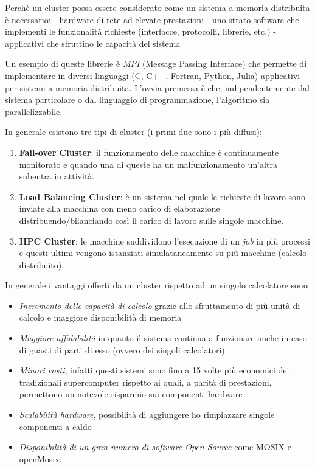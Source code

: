 \documentclass[italian,]{article}
\providecommand{\tightlist}{%
  \setlength{\itemsep}{0pt}\setlength{\parskip}{0pt}}
\begin{document}
Perchè un cluster possa essere considerato come un sistema a memoria
distribuita è necessario: - hardware di rete ad elevate prestazioni -
uno strato software che implementi le funzionalità richieste
(interfacce, protocolli, librerie, etc.) - applicativi che sfruttino le
capacità del sistema

Un esempio di queste librerie è \emph{MPI} (Message Passing Interface)
che permette di implementare in diversi linguaggi (C, C++, Fortran,
Python, Julia) applicativi per sistemi a memoria distribuita. L'ovvia
premessa è che, indipendentemente dal sistema particolare o dal
linguaggio di programmazione, l'algoritmo sia parallelizzabile.

In generale esistono tre tipi di cluster (i primi due sono i più
diffusi):

\begin{enumerate}
\def\labelenumi{\arabic{enumi}.}
\tightlist
\item
  \textbf{Fail-over Cluster}: il funzionamento delle macchine è
  continuamente monitorato e quando una di queste ha un malfunzionamento
  un'altra subentra in attività.
\item
  \textbf{Load Balancing Cluster}: è un sistema nel quale le richieste
  di lavoro sono inviate alla macchina con meno carico di elaborazione
  distribuendo/bilanciando così il carico di lavoro sulle singole
  macchine.
\item
  \textbf{HPC Cluster}: le macchine suddividono l'esecuzione di un
  \emph{job} in più processi e questi ultimi vengono istanziati
  simulataneamente su più macchine (calcolo distribuito).
\end{enumerate}

In generale i vantaggi offerti da un cluster rispetto ad un singolo
calcolatore sono

\begin{itemize}
\tightlist
\item
  \emph{Incremento delle capacità di calcolo} grazie allo sfruttamento
  di più unità di calcolo e maggiore disponibilità di memoria
\item
  \emph{Maggiore affidabilità} in quanto il sistema continua a
  funzionare anche in caso di guasti di parti di esso (ovvero dei
  singoli calcolatori)
\item
  \emph{Minori costi}, infatti questi sistemi sono fino a 15 volte più
  economici dei tradizionali supercomputer rispetto ai quali, a parità
  di prestazioni, permettono un notevole risparmio sui componenti
  hardware
\item
  \emph{Scalabilità hardware}, possibilità di aggiungere ho rimpiazzare
  singole componenti a caldo
\item
  \emph{Disponibilità di un gran numero di software Open Source} come
  MOSIX e openMosix.
\end{itemize}
\end{document}

